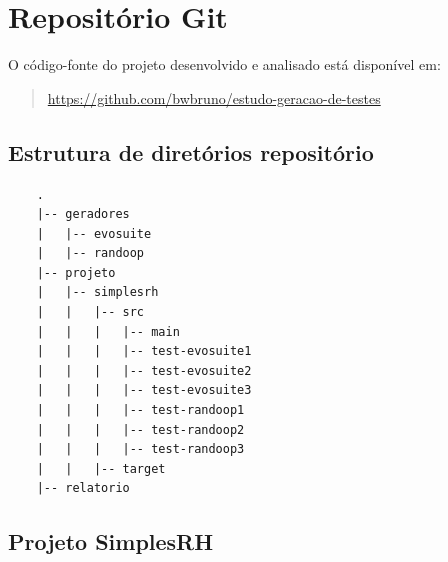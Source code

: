 \documentclass[10pt]{article}
\begin{document}


\fontsize{12}{12}\selectfont
\section{Repositório Git}

O código-fonte do projeto desenvolvido e analisado está disponível em:

\begin{quote}
\url{https://github.com/bwbruno/estudo-geracao-de-testes}
\end{quote}

\subsection{Estrutura de diretórios repositório}

\begin{mdframed}[backgroundcolor=gray!10]
\begin{lstlisting}
    .
    |-- geradores
    |   |-- evosuite
    |   |-- randoop
    |-- projeto
    |   |-- simplesrh
    |   |   |-- src
    |   |   |   |-- main
    |   |   |   |-- test-evosuite1
    |   |   |   |-- test-evosuite2
    |   |   |   |-- test-evosuite3
    |   |   |   |-- test-randoop1
    |   |   |   |-- test-randoop2
    |   |   |   |-- test-randoop3
    |   |   |-- target
    |-- relatorio
\end{lstlisting}
\end{mdframed}

\subsection{Projeto SimplesRH}
\end{document}

